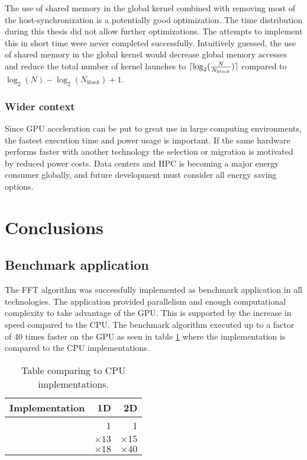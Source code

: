 The use of shared memory in the global \gls{kernel} combined with removing most of the host-synchronization is a potentially good optimization. The time distribution during this thesis did not allow further optimizations. The attempts to implement this in short time were never completed successfully. Intuitively guessed, the use of shared memory in the global kernel would decrease global memory accesses and reduce the total number of kernel launches to $\lceil\log_{2}(\frac{N}{N_{block}})\rceil$ compared to $\log_{2}(N) - \log_{2}(N_{block}) + 1$.

\subsubsection{Wider context}

Since \gls{GPU} acceleration can be put to great use in large computing environments, the fastest execution time and power usage is important. If the same hardware performs faster with another technology the selection or migration is motivated by reduced power costs. Data centers and \gls{HPC} is becoming a major energy consumer globally, and future development must consider all energy saving options.

\section{Conclusions}

\subsection{Benchmark application}

The \gls{FFT} algorithm was successfully implemented as benchmark application in all technologies. The application provided parallelism and enough computational complexity to take advantage of the \gls{GPU}. This is supported by the increase in speed compared to the \gls{CPU}. The benchmark algorithm executed up to a factor of $40$ times faster on the GPU as seen in table \ref{tab:cu-vs-cpu} where the {\CU} implementation is compared to the CPU implementations.

\begin{table}
	\centering	
	\begin{tabular}{|l|r|r|}
		\hline
		Implementation & 1D & 2D \\ \hline
		{\CU} & 1 & 1 \\ \hline
		{\OMP} & ${\times}13$ & ${\times}15$ \\ \hline
		{\CPP} & ${\times}18$ & ${\times}40$ \\ \hline
	\end{tabular}
	\caption{Table comparing {\CU} to CPU implementations.}
	\label{tab:cu-vs-cpu}
\end{table}

